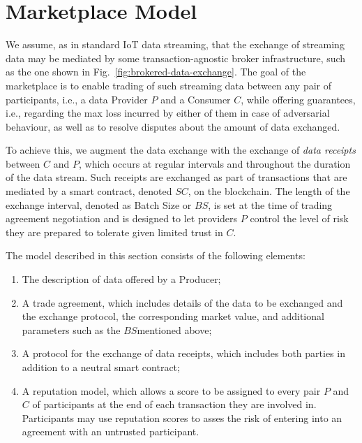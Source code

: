 \documentclass[letterpaper, 10 pt, conference]{ieeeconf}  %
\newcommand{\bs}{\ensuremath{\mathit{BS}}}
\newcommand{\smartc}{\ensuremath{\mathit{SC}}}
\begin{document}
\section{Marketplace Model} \label{sec:MKModel}

We assume, as in standard IoT data streaming, that the exchange of streaming data may be mediated by some transaction-agnostic broker infrastructure, such as the one shown in Fig.~\ref{fig:brokered-data-exchange}.
The goal of the marketplace is to enable trading of such streaming data between any pair of  participants, i.e., a data Provider  $P$ and a Consumer $C$, while offering guarantees, i.e., 
regarding the max  loss incurred by either of them in case of adversarial behaviour, as well as to resolve disputes about the amount of data exchanged.

To achieve this, we augment the data exchange with the exchange of \textit{data receipts} between $C$ and $P$, which occurs at regular intervals and throughout the duration of the data stream. Such receipts are exchanged as part of transactions that are mediated by a smart contract, denoted \smartc, on the blockchain. 
The length of the exchange interval, denoted as Batch Size or \bs, is set at the time of trading agreement negotiation and is designed to let providers $P$ control the level of risk they are prepared to tolerate given limited trust in $C$.

The model described in this section consists of the following elements:
\begin{enumerate}
	
	\item The description of data offered by a Producer;
	
	\item A trade agreement, which includes details of the data to be exchanged and the exchange protocol, the corresponding market value, and additional parameters such as the \bs mentioned above;
	
	\item A protocol for the exchange of data receipts, which includes both parties in addition to a neutral smart contract;
	
	\item A reputation model, which allows a score to be assigned to every pair $P$ and $C$ of participants at the end of each transaction they are involved in. 
	Participants may use reputation scores to asses the risk of entering into an agreement with an untrusted participant.

\end{enumerate}
\end{document}
